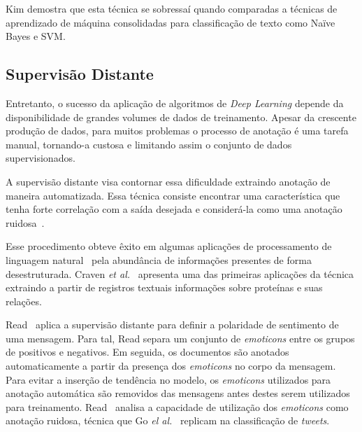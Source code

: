Kim demostra que esta técnica se sobressaí quando comparadas a técnicas de aprendizado de máquina consolidadas para
classificação de texto como Naïve Bayes e SVM.

\subsection{Supervisão Distante}\label{distant_supervision}

Entretanto, o sucesso da aplicação de algoritmos de \textit{Deep Learning} depende da disponibilidade de grandes volumes
de dados de treinamento.
Apesar da crescente produção de dados, para muitos problemas o processo de anotação é uma tarefa manual, tornando-a
custosa e limitando assim o conjunto de dados supervisionados.

A supervisão distante visa contornar essa dificuldade extraindo anotação de maneira automatizada.
Essa técnica consiste encontrar uma característica que tenha forte correlação com a saída desejada e considerá-la como
uma anotação ruidosa~\cite{go09}.

Esse procedimento obteve êxito em algumas aplicações de processamento de linguagem natural~\cite{craven99}\cite{go09}
pela abundância de informações presentes de forma desestruturada.
Craven \textit{et al.}~\cite{craven99} apresenta uma das primeiras aplicações da técnica extraindo a partir de registros
textuais informações sobre proteínas e suas relações.

Read~\cite{read05} aplica a supervisão distante para definir a polaridade de sentimento de uma mensagem.
Para tal, Read separa um conjunto de \textit{emoticons} entre os grupos de positivos e negativos.
Em seguida, os documentos são anotados automaticamente a partir da presença dos \textit{emoticons} no corpo da mensagem.
Para evitar a inserção de tendência no modelo, os \textit{emoticons} utilizados para anotação automática são removidos
das mensagens antes destes serem utilizados para treinamento.
Read~\cite{read05} analisa a capacidade de utilização dos \textit{emoticons} como anotação ruidosa, técnica que Go
\textit{el al.}~\cite{go09} replicam na classificação de \textit{tweets}.

